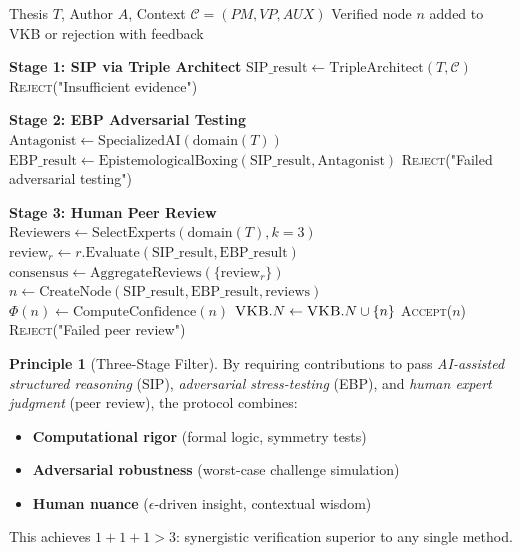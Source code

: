 \documentclass[11pt,a4paper]{article}
\theoremstyle{definition}
\newtheorem{principle}{Principle}[section]
\theoremstyle{remark}
\newcommand{\VKB}{\textsc{VKB}}
\newcommand{\SIP}{\textsc{SIP}}
\newcommand{\EBP}{\textsc{EBP}}
\begin{document}
\begin{algorithm}[H]
\caption{VKB Contribution Verification Protocol}
\begin{algorithmic}[1]
\Require Thesis $T$, Author $A$, Context $\mathcal{C} = (PM, VP, AUX)$
\Ensure Verified node $n$ added to \VKB{} or rejection with feedback

\State \textbf{Stage 1: \SIP{} via Triple Architect}
\State $\text{SIP\_result} \gets \text{TripleArchitect}(T, \mathcal{C})$
\State {}
    \State \Return \textsc{Reject}("Insufficient evidence")
\EndIf

\State \textbf{Stage 2: \EBP{} Adversarial Testing}
\State $\text{Antagonist} \gets \text{SpecializedAI}(\text{domain}(T))$
\State $\text{EBP\_result} \gets \text{EpistemologicalBoxing}(\text{SIP\_result}, \text{Antagonist})$
\State {}
    \State \Return \textsc{Reject}("Failed adversarial testing")
\EndIf

\State \textbf{Stage 3: Human Peer Review}
\State $\text{Reviewers} \gets \text{SelectExperts}(\text{domain}(T), k=3)$
    \State $\text{review}_r \gets r.\text{Evaluate}(\text{SIP\_result}, \text{EBP\_result})$
\EndFor
\State $\text{consensus} \gets \text{AggregateReviews}(\{\text{review}_r\})$
    \State $n \gets \text{CreateNode}(\text{SIP\_result}, \text{EBP\_result}, \text{reviews})$
    \State $\Phi(n) \gets \text{ComputeConfidence}(n)$
    \State $\VKB.N \gets \VKB.N \cup \{n\}$
    \State \Return \textsc{Accept}($n$)
\Else
    \State \Return \textsc{Reject}("Failed peer review")
\EndIf
\end{algorithmic}
\end{algorithm}

\begin{principle}[Three-Stage Filter]
By requiring contributions to pass \textit{AI-assisted structured reasoning} (\SIP{}), \textit{adversarial stress-testing} (\EBP{}), and \textit{human expert judgment} (peer review), the protocol combines:
\begin{itemize}
    \item \textbf{Computational rigor} (formal logic, symmetry tests)
    \item \textbf{Adversarial robustness} (worst-case challenge simulation)
    \item \textbf{Human nuance} ($\epsilon$-driven insight, contextual wisdom)
\end{itemize}
This achieves $1+1+1 > 3$: synergistic verification superior to any single method.
\end{principle}
\end{document}
